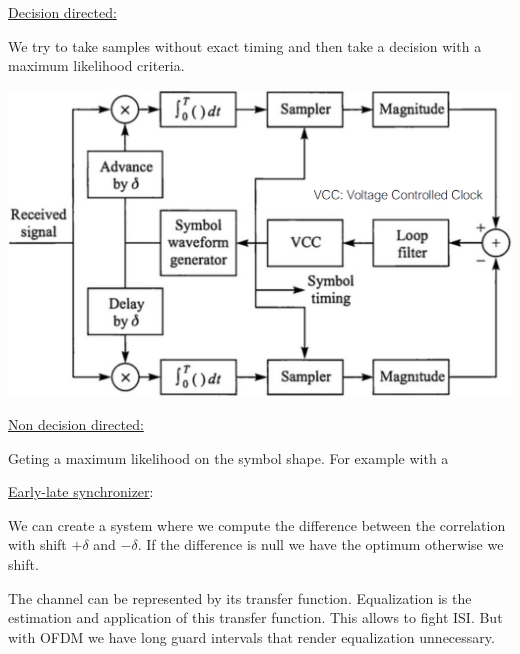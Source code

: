 \underline{Decision directed:}

We try to take samples without
exact timing and then take a decision with a
maximum likelihood criteria.


\includegraphics[width=\columnwidth]{images/early_state_synch.png}

\underline{Non decision directed:}

Geting a maximum likelihood on the symbol shape. For example
with a

\underline{Early-late synchronizer}:

We can create a system where we compute the difference between the correlation with shift
$+\delta$ and $-\delta$. If the difference is null we have the optimum otherwise we shift.

The channel can be represented by its transfer function. Equalization is the estimation and application of this
transfer function. This allows to fight ISI. But with OFDM we have long guard intervals that
render equalization unnecessary.